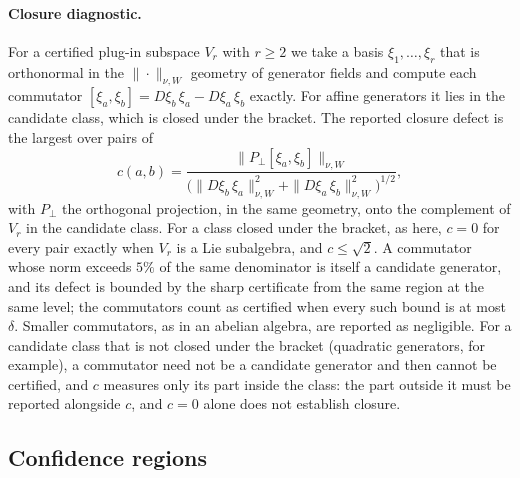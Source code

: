 \paragraph{Closure diagnostic.} For a certified plug-in subspace $V_r$ with
$r \ge 2$ we take a basis $\xi_1,\dots,\xi_r$ that is orthonormal in the
$\|\cdot\|_{\nu,W}$ geometry of generator fields and compute each commutator
$[\xi_a,\xi_b] = D\xi_b\,\xi_a - D\xi_a\,\xi_b$ exactly. For affine generators
it lies in the candidate class, which is closed under the bracket. The
reported closure defect is the largest over pairs of
\[
  c(a,b) = \frac{\|P_\perp[\xi_a,\xi_b]\|_{\nu,W}}
  {\bigl(\|D\xi_b\,\xi_a\|^2_{\nu,W} + \|D\xi_a\,\xi_b\|^2_{\nu,W}\bigr)^{1/2}},
\]
with $P_\perp$ the orthogonal projection, in the same geometry, onto the
complement of $V_r$ in the candidate class. For a class closed under the
bracket, as here, $c = 0$ for every pair exactly when $V_r$ is a Lie
subalgebra, and $c \le \sqrt 2$. A commutator whose norm
exceeds $5\%$ of the same denominator is itself a candidate generator, and its
defect is bounded by the sharp certificate from the same region at the same
level; the commutators count as certified when every such bound is at most
$\delta$. Smaller commutators, as in an abelian algebra, are reported as
negligible. For a candidate class that is not closed under the bracket
(quadratic generators, for example), a commutator need not be a candidate
generator and then cannot be certified, and $c$ measures only its part inside
the class: the part outside it must be reported alongside $c$, and $c = 0$
alone does not establish closure.

\subsection{Confidence regions}
\label{sec:regions}

